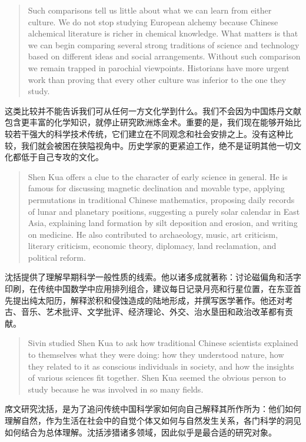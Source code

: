 \documentclass[UTF8,zihao=-4]{ctexart}
\newenvironment{enblock}
  {\par\smallskip\noindent{\scriptsize\bfseries English}\par\begin{quote}\small}
  {\end{quote}}
\newenvironment{zhblock}
  {\par\noindent{\scriptsize\bfseries 中文}\par}
  {\par\medskip}
\begin{document}
\begin{enblock}
Such comparisons tell us little about what we can learn from either culture. We do not stop studying European alchemy because Chinese alchemical literature is richer in chemical knowledge. What matters is that we can begin comparing several strong traditions of science and technology based on different ideas and social arrangements. Without such comparison we remain trapped in parochial viewpoints. Historians have more urgent work than proving that every other culture was inferior to the one they study.
\end{enblock}
\begin{zhblock}
这类比较并不能告诉我们可从任何一方文化学到什么。我们不会因为中国炼丹文献包含更丰富的化学知识，就停止研究欧洲炼金术。重要的是，我们现在能够开始比较若干强大的科学技术传统，它们建立在不同观念和社会安排之上。没有这种比较，我们就会被困在狭隘视角中。历史学家的更紧迫工作，绝不是证明其他一切文化都低于自己专攻的文化。
\end{zhblock}

\begin{enblock}
Shen Kua offers a clue to the character of early science in general. He is famous for discussing magnetic declination and movable type, applying permutations in traditional Chinese mathematics, proposing daily records of lunar and planetary positions, suggesting a purely solar calendar in East Asia, explaining land formation by silt deposition and erosion, and writing on medicine. He also contributed to archaeology, music, art criticism, literary criticism, economic theory, diplomacy, land reclamation, and political reform.
\end{enblock}
\begin{zhblock}
沈括提供了理解早期科学一般性质的线索。他以诸多成就著称：讨论磁偏角和活字印刷，在传统中国数学中应用排列组合，建议每日记录月亮和行星位置，在东亚首先提出纯太阳历，解释淤积和侵蚀造成的陆地形成，并撰写医学著作。他还对考古、音乐、艺术批评、文学批评、经济理论、外交、治水垦田和政治改革都有贡献。
\end{zhblock}

\begin{enblock}
Sivin studied Shen Kua to ask how traditional Chinese scientists explained to themselves what they were doing: how they understood nature, how they related to it as conscious individuals in society, and how the insights of various sciences fit together. Shen Kua seemed the obvious person to study because he was involved in so many fields.
\end{enblock}
\begin{zhblock}
席文研究沈括，是为了追问传统中国科学家如何向自己解释其所作所为：他们如何理解自然，作为生活在社会中的自觉个体又如何与自然发生关系，各门科学的洞见如何结合为总体理解。沈括涉猎诸多领域，因此似乎是最合适的研究对象。
\end{zhblock}
\end{document}
